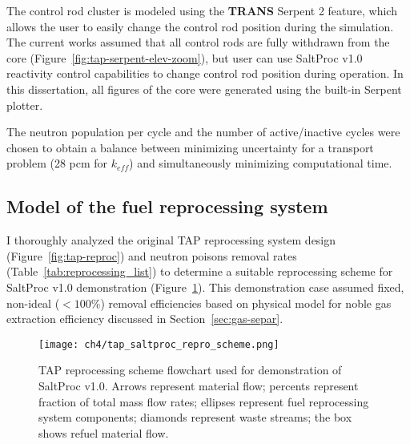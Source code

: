 The control rod cluster is modeled using the \textbf{TRANS} Serpent 2 feature, 
which allows the user to easily change the control rod position during the 
simulation. The current works assumed that all control rods are fully 
withdrawn from the core (Figure~\ref{fig:tap-serpent-elev-zoom}), but user can 
use SaltProc v1.0 reactivity control capabilities to change control 
rod position during operation. In this dissertation, all figures of the core 
were generated using the built-in Serpent plotter.

The neutron population per cycle and the number of active/inactive cycles were 
chosen
to obtain a balance between minimizing uncertainty for a transport 
problem (28 pcm for
$k_{eff}$) and simultaneously minimizing computational 
time.


\subsection{Model of the fuel reprocessing system}
I thoroughly analyzed the original \gls{TAP} reprocessing system design 
(Figure~\ref{fig:tap-reproc}) and neutron poisons removal rates  
(Table~\ref{tab:reprocessing_list}) to determine a suitable reprocessing 
scheme for SaltProc v1.0 demonstration (Figure~\ref{fig:demo-repro-scheme}). 
This demonstration case assumed fixed, non-ideal ($<100$\%) removal 
efficiencies based on physical model for noble gas extraction efficiency 
discussed in Section~\ref{sec:gas-separ}. 
\begin{figure}[htp!] %
	\centering
	\texttt{[image: ch4/tap\_saltproc\_repro\_scheme.png]}
	\caption{\gls{TAP} reprocessing scheme flowchart used for demonstration of 
	SaltProc v1.0. Arrows represent material flow; percents represent fraction 
	of total mass flow rates; ellipses represent fuel reprocessing 
	system components; diamonds represent waste streams; the box shows 
		refuel material flow.}
	\label{fig:demo-repro-scheme}
\end{figure}

